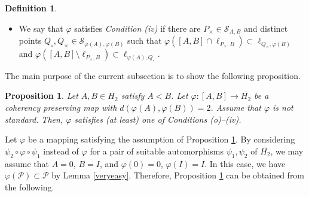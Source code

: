 \documentclass[10pt]{amsart}
\newtheorem{proposition}[theorem]{Proposition}
\theoremstyle{definition}
\newtheorem{definition}[theorem]{Definition}
\theoremstyle{remark}
\numberwithin{subsection}{section}
\numberwithin{equation}{section}
\newcommand\cP{{\mathcal{P}}}
\newcommand\oH{{\overline{H_2}}}
\begin{document}
\begin{definition}
\begin{itemize}
\item We say that $\varphi$ satisfies \emph{Condition (iv)}  if there are $P_\times\in \mathcal{S}_{A, B}$ and distinct points $Q_\circ, Q_\times\in \mathcal{S}_{\varphi(A), \varphi(B)}$ such that $\varphi([A, B]\cap \ell_{P_\times, B})\subset \ell_{Q_\times, \varphi(B)}$ and $\varphi([A, B]\setminus \ell_{P_\times, B})\subset \ell_{\varphi(A), Q_\circ}$. 
\end{itemize} 
\end{definition}

The main purpose of the current subsection is to show the following proposition.
\begin{proposition}\label{newprop}
Let $A, B\in H_2$ satisfy $A<B$. 
Let $\varphi\colon [A, B]\to \oH$ be a coherency preserving map with $d(\varphi(A), \varphi(B))=2$. 
Assume that $\varphi$ is not standard.
Then, $\varphi$ satisfies (at least) one of Conditions (o)--(iv). 
\end{proposition}

Let $\varphi$ be a mapping satisfying the assumption of Proposition \ref{newprop}.
By considering $\psi_2\circ\varphi\circ \psi_1$ instead of $\varphi$ for a pair of suitable automorphisms $\psi_1, \psi_2$ of $\oH$, we may assume that $A=0$, $B=I$, and $\varphi(0)=0$, $\varphi(I)=I$.
In this case, we have $\varphi(\cP)\subset \cP$ by Lemma \ref{veryeasy}.
Therefore, Proposition \ref{newprop} can be obtained from the following.
\end{document}
